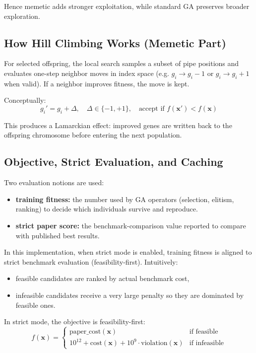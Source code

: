 \documentclass[12pt, a4paper]{article}
\begin{document}
Hence memetic adds stronger exploitation, while standard GA preserves broader exploration.

\subsection{How Hill Climbing Works (Memetic Part)}

For selected offspring, the local search samples a subset of pipe positions and evaluates one-step neighbor moves in index space (e.g. $g_i \rightarrow g_i - 1$ or $g_i \rightarrow g_i + 1$ when valid). If a neighbor improves fitness, the move is kept.

Conceptually:
\[
	g_i' = g_i + \Delta,\quad \Delta \in \{-1,+1\},\quad
	\text{accept if } f(\mathbf{x}') < f(\mathbf{x})
\]

This produces a Lamarckian effect: improved genes are written back to the offspring chromosome before entering the next population.

\subsection{Objective, Strict Evaluation, and Caching}

Two evaluation notions are used:
\begin{itemize}
	\item \textbf{training fitness:} the number used by GA operators (selection, elitism, ranking) to decide which individuals survive and reproduce.
	\item \textbf{strict paper score:} the benchmark-comparison value reported to compare with published best results.
\end{itemize}

In this implementation, when strict mode is enabled, training fitness is aligned to strict benchmark evaluation (feasibility-first). Intuitively:
\begin{itemize}
	\item feasible candidates are ranked by actual benchmark cost,
	\item infeasible candidates receive a very large penalty so they are dominated by feasible ones.
\end{itemize}

In strict mode, the objective is feasibility-first:
\[
	f(\mathbf{x})=
	\begin{cases}
		\text{paper\_cost}(\mathbf{x})                                        & \text{if feasible}   \\
		10^{12}+\text{cost}(\mathbf{x})+10^9\cdot\text{violation}(\mathbf{x}) & \text{if infeasible}
	\end{cases}
\]
\end{document}
